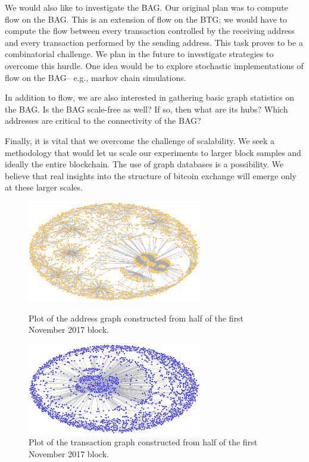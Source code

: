 \documentclass[letterpaper, 10 pt, conference]{ieeeconf}  %
\begin{document}
We would also like to investigate the BAG. Our original plan was to compute flow on the BAG. This is an extension of flow on the BTG; we would have to compute the flow between every transaction controlled by the receiving address and every transaction performed by the sending address. This task proves to be a combinatorial challenge. We plan in the future to investigate strategies to overcome this hurdle. One idea would be to explore stochastic implementations of flow on the BAG-- e.g., markov chain simulations.

In addition to flow, we are also interested in gathering basic graph statistics on the BAG. Is the BAG scale-free as well? If so, then what are its hubs? Which addresses are critical to the connectivity of the BAG?

Finally, it is vital that we overcome the challenge of scalability. We seek a methodology that would let us scale our experiments to larger block samples and ideally the entire blockchain. The use of graph databases is a possibility. We believe that real insights into the structure of bitcoin exchange will emerge only at these larger scales.





\begin{figure}
\centering
\includegraphics[width=3in]{Plots/address.eps}
\caption{\label{flow} Plot of the address graph constructed from half of the first November 2017 block.}
\includegraphics[width=3in]{Plots/transaction_november.eps}
\caption{\label{flow} Plot of the transaction graph constructed from half of the first November 2017 block.}
\end{figure}
\end{document}
